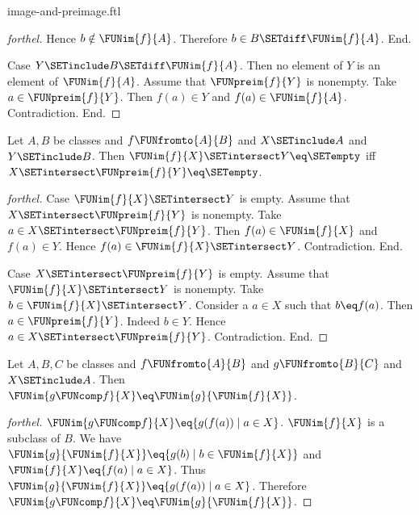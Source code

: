 \documentclass{naproche-library}
\begin{document}
\begin{smodule}[title=Computation Laws for Images and Preimages]{image-and-preimage.ftl}
\begin{proof}[forthel]
    Hence $b \notin \FUNim{f}{A}$.
    Therefore $b \in B \SETdiff \FUNim{f}{A}$.
  End.

  Case $Y \SETinclude B \SETdiff \FUNim{f}{A}$.
    Then no element of $Y$ is an element of $\FUNim{f}{A}$.
    Assume that $\FUNpreim{f}{Y}$ is nonempty.
    Take $a \in \FUNpreim{f}{Y}$.
    Then $f(a) \in Y$ and $f(a) \in \FUNim{f}{A}$.
    Contradiction.
  End.
\end{proof}

\begin{proposition}[forthel,id=FOUNDATIONS_07_6295504988143616]
  Let $A, B$ be classes and $f \FUNfromto{A}{B}$ and $X \SETinclude A$ and $Y \SETinclude B$.
  Then $\FUNim{f}{X} \SETintersect Y \eq \SETempty$ iff $X \SETintersect \FUNpreim{f}{Y} \eq \SETempty$.
\end{proposition}
\begin{proof}[forthel]
  Case $\FUNim{f}{X} \SETintersect Y$ is empty.
    Assume that $X \SETintersect \FUNpreim{f}{Y}$ is nonempty.
    Take $a \in X \SETintersect \FUNpreim{f}{Y}$.
    Then $f(a) \in \FUNim{f}{X}$ and $f(a) \in Y$.
    Hence $f(a) \in \FUNim{f}{X} \SETintersect Y$.
    Contradiction.
  End.

  Case $X \SETintersect \FUNpreim{f}{Y}$ is empty.
    Assume that $\FUNim{f}{X} \SETintersect Y$ is nonempty.
    Take $b \in \FUNim{f}{X} \SETintersect Y$.
    Consider a $a \in X$ such that $b \eq f(a)$.
    Then $a \in \FUNpreim{f}{Y}$.
    Indeed $b \in Y$.
    Hence $a \in X \SETintersect \FUNpreim{f}{Y}$.
    Contradiction.
  End.
\end{proof}

\begin{proposition}[forthel,id=FOUNDATIONS_07_5628919411638272]
  Let $A, B, C$ be classes and $f \FUNfromto{A}{B}$ and $g \FUNfromto{B}{C}$ and $X \SETinclude A$.
  Then $\FUNim{g \FUNcomp f}{X} \eq \FUNim{g}{\FUNim{f}{X}}$.
\end{proposition}
\begin{proof}[forthel]
  $\FUNim{g \FUNcomp f}{X} \eq \{ g(f(a)) \mid a \in X \}$.
  $\FUNim{f}{X}$ is a subclass of $B$.
  We have $\FUNim{g}{\FUNim{f}{X}} \eq \{ g(b) \mid b \in \FUNim{f}{X} \}$ and $\FUNim{f}{X} \eq \{ f(a) \mid a \in X \}$.
  Thus $\FUNim{g}{\FUNim{f}{X}} \eq \{ g(f(a)) \mid a \in X \}$.
  Therefore $\FUNim{g \FUNcomp f}{X} \eq \FUNim{g}{\FUNim{f}{X}}$.
\end{proof}


\end{smodule}
\end{document}
